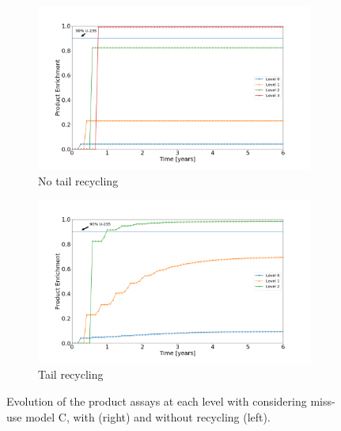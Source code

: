 \begin{figure}[t!]
    \centering
    \begin{subfigure}[t]{0.45\textwidth}
        \centering
        \includegraphics[scale=0.18]{NR_case3}
        \caption{No tail recycling}
    \end{subfigure}%
    \begin{subfigure}[t]{0.45\textwidth}
        \centering
        \includegraphics[scale=0.18]{R_case3}
        \caption{Tail recycling}
    \end{subfigure}
    \caption{Evolution of the product assays at each level with considering
    miss-use model C, with (right) and without recycling (left).}
\end{figure}

